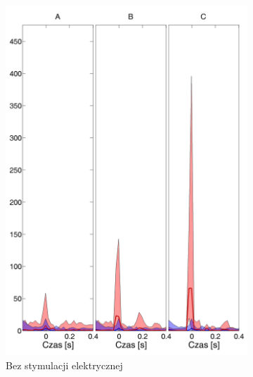 \documentclass{pracamgr}
\begin{document}
	\begin{figure}[h]
		\begin{subfigure}{.5\textwidth}
			\centering
			\includegraphics[width=1.\linewidth]{kontrola15_20-40_z_SC6_do_CxC102.png}
			\caption{Bez stymulacji elektrycznej}
			\label{rys:20_40_kon_SC_CxC}
		\end{subfigure}%
		\begin{subfigure}{.5\textwidth}
			\centering

\end{subfigure}
\end{figure}
\end{document}

